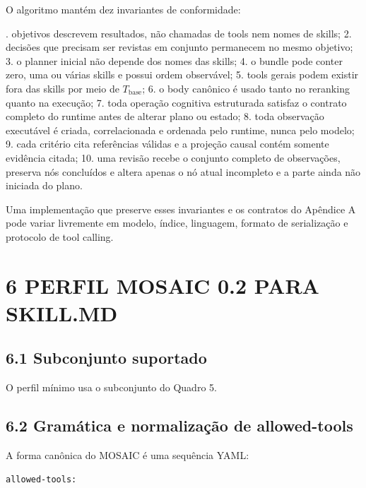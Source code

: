 \documentclass[12pt,a4paper]{article}
\begin{document}
O algoritmo mantém dez invariantes de conformidade:


. objetivos descrevem resultados, não chamadas de tools nem nomes de skills; 2. decisões que precisam ser revistas em conjunto permanecem no mesmo objetivo; 3. o planner inicial não depende dos nomes das skills; 4. o bundle pode conter zero, uma ou várias skills e possui ordem observável; 5. tools gerais podem existir fora das skills por meio de \(T_{\mathrm{base}}\); 6. o body canônico é usado tanto no reranking quanto na execução; 7. toda operação cognitiva estruturada satisfaz o contrato completo do runtime antes de alterar plano ou estado; 8. toda observação executável é criada, correlacionada e ordenada pelo runtime, nunca pelo modelo; 9. cada critério cita referências válidas e a projeção causal contém somente evidência citada; 10. uma revisão recebe o conjunto completo de observações, preserva nós concluídos e altera apenas o nó atual incompleto e a parte ainda não iniciada do plano.\par

Uma implementação que preserve esses invariantes e os contratos do Apêndice A pode variar livremente em modelo, índice, linguagem, formato de serialização e protocolo de tool calling.


\section*{6 PERFIL MOSAIC 0.2 PARA SKILL.MD}

\subsection*{6.1 Subconjunto suportado}

O perfil mínimo usa o subconjunto do Quadro 5.





\subsection*{6.2 Gramática e normalização de allowed-tools}

A forma canônica do MOSAIC é uma sequência YAML:


\begin{Verbatim}[breaklines=true,breakanywhere=true,fontsize=\small]
allowed-tools:
\end{Verbatim}
\end{document}
